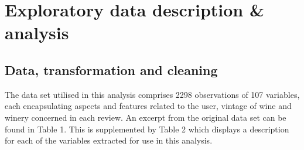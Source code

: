 \documentclass[11pt,preprint]{elsarticle}
\numberwithin{equation}{section}
\numberwithin{figure}{section}
\numberwithin{table}{section}
\begin{document}
\newpage

\section{Exploratory data description \&
analysis}\label{exploratory-data-description-analysis}

\label{Data}

\subsection{Data, transformation and
cleaning}\label{data-transformation-and-cleaning}

The data set utilised in this analysis comprises 2298 observations of
107 variables, each encapsulating aspects and features related to the
user, vintage of wine and winery concerned in each review. An excerpt
from the original data set can be found in Table 1. This is supplemented
by Table 2 which displays a description for each of the variables
extracted for use in this analysis.
\end{document}
